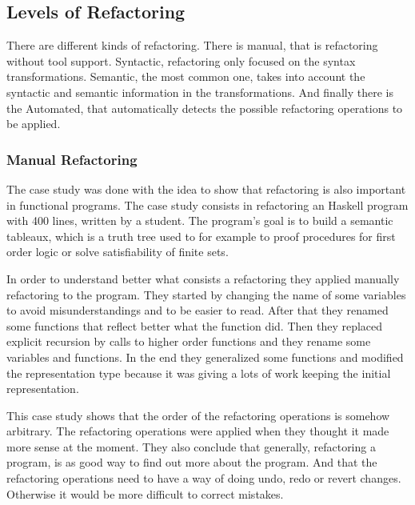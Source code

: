 \subsection{Levels of Refactoring}
There are different kinds of refactoring. 
There is manual, that is refactoring without tool support. 
Syntactic, refactoring only focused on the syntax transformations.
Semantic, the most common one, takes into account the syntactic and semantic information in the transformations. 
And finally there is the Automated, that automatically detects the possible refactoring operations to be applied.


\subsubsection{Manual Refactoring}
The case study \cite{thompson2003case} was done with the idea to show that refactoring is also important in functional programs.
The case study consists in refactoring an Haskell program with 400 lines, written by a student.
The program's goal is to build a semantic tableaux, which is a truth tree used to  for example to proof procedures for first order logic or solve satisfiability of finite sets.

In order to understand better what consists a refactoring they applied manually refactoring to the program.
They started by changing the name of some variables to avoid misunderstandings and to be easier to read.
After that they renamed some functions that reflect better what the function did. 
Then they replaced explicit recursion by calls to higher order functions and they rename some variables and functions.
In the end they generalized some functions and modified the representation type because it was giving a lots of work keeping the initial representation.

This case study shows that the order of the refactoring operations is somehow arbitrary.
The refactoring operations were applied when they thought it made more sense at the moment.
They also conclude that generally, refactoring a program, is as good way to find out more about the program. 
And that the refactoring operations need to have a way of doing undo, redo or revert changes. 
Otherwise it would be more difficult to correct mistakes.


